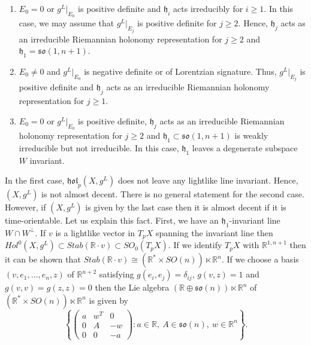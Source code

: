 \documentclass[a4paper,10pt,twoside]{amsart}
\theoremstyle{definition}
\theoremstyle{remark}
\numberwithin{equation}{section}
\begin{document}
\begin{enumerate}
	\item
	$E_{0}=0$ or $g^{L}|_{E_{0}}$ is positive definite and ${\mathfrak{{h}}}_{i}$ acts irreducibly for $i \geq 1$. In this case, we may assume that
	$g^{L}|_{E_{j}}$ is positive definite for $j \geq 2$. Hence, ${\mathfrak{{h}}}_{j}$ acts as an irreducible Riemannian holonomy representation for
	$j \geq 2$ and ${\mathfrak{{h}}}_{1} = {\mathfrak{{so}}}(1,n+1)$.
	\item
	$E_{0} \neq 0$ and $g^{L}|_{E_{0}}$ is negative definite or of Lorentzian signature. Thus, $g^{L}|_{E_{j}}$ is positive definite and
	${\mathfrak{{h}}}_{j}$ acts as an irreducible Riemannian holonomy representation for $j \geq 1$.
	\item
	$E_{0}=0$ or $g^{L}|_{E_{0}}$ is positive definite, ${\mathfrak{{h}}}_{j}$ acts as an irreducible Riemannian holonomy representation for $j \geq 2$
	and ${\mathfrak{{h}}}_{1} \subset {\mathfrak{{so}}}(1,n+1)$ is weakly irreducible but not irreducible. In this case, ${\mathfrak{{h}}}_{1}$ leaves a degenerate
	subspace $W$ invariant.
\end{enumerate}
In the first case, ${\mathfrak{{hol}}}_{p}(X,g^{L})$ does not leave any lightlike line invariant. Hence, $(X,g^{L})$ is not almost decent. There is no
general statement for the second case. However, if $(X,g^{L})$ is given by the last case then it is almost decent if it is time-orientable. Let us
explain this fact. First, we have an ${\mathfrak{{h}}}_{1}$-invariant line $W \cap W^{\perp}$. If $v$ is a lightlike vector in $T_{p}X$ spanning the invariant
line then $Hol^{0}(X,g^{L}) \subset Stab({\mathbb{R}} \cdot v) \subset SO_{0}(T_{p}X)$. If we identify $T_{p}X$ with ${\mathbb{R}}^{1,n+1}$ then it can be shown that
$Stab({\mathbb{R}} \cdot v) \cong ({\mathbb{R}}^{*} \times SO(n)) \ltimes {\mathbb{R}}^{n}$. If we choose a basis $(v,e_{1},\ldots,e_{n},z)$ of ${\mathbb{R}}^{n+2}$
satisfying $g(e_{i},e_{j})=\delta_{ij}$, $g(v,z)=1$ and $g(v,v)=g(z,z)=0$ then the Lie algebra $({\mathbb{R}} \oplus {\mathfrak{{so}}}(n)) \ltimes {\mathbb{R}}^{n}$ of
$({\mathbb{R}}^{*} \times SO(n)) \ltimes {\mathbb{R}}^{n}$ is given by
\begin{equation*}
	\left\lbrace \begin{pmatrix} a & w^{T} & 0\\ 0 & A & -w\\ 0 & 0 & -a \end{pmatrix}
								: a \in {\mathbb{R}},~A \in {\mathfrak{{so}}}(n),~w \in {\mathbb{R}}^{n} \right\rbrace.
\end{equation*}
\end{document}
